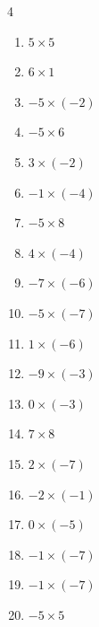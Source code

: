 \begin{multicols}{4}
\begin{enumerate}
  \item $5\times 5$
        \phantom{$=25$}

  \item $6\times 1$
        \phantom{$=6$}

  \item $-5\times (-2)$
        \phantom{$=10$}

\columnbreak %

  \item $-5\times 6$
        \phantom{$=-30$}

  \item $3\times (-2)$
        \phantom{$=-6$}

  \item $-1\times (-4)$
        \phantom{$=4$}

  \item $-5\times 8$
        \phantom{$=-40$}

  \item $4\times (-4)$
        \phantom{$=-16$}

  \item $-7\times (-6)$
        \phantom{$=42$}

  \item $-5\times (-7)$
        \phantom{$=35$}

  \item $1\times (-6)$
        \phantom{$=-6$}

  \item $-9\times (-3)$
        \phantom{$=27$}

  \item $0\times (-3)$
        \phantom{$=0$}

  \item $7\times 8$
        \phantom{$=56$}

  \item $2\times (-7)$
        \phantom{$=-14$}

  \item $-2\times (-1)$
        \phantom{$=2$}

  \item $0\times (-5)$
        \phantom{$=0$}

  \item $-1\times (-7)$
        \phantom{$=7$}

  \item $-1\times (-7)$
        \phantom{$=7$}

  \item $-5\times 5$
        \phantom{$=-25$}


\end{enumerate}
\end{multicols}
